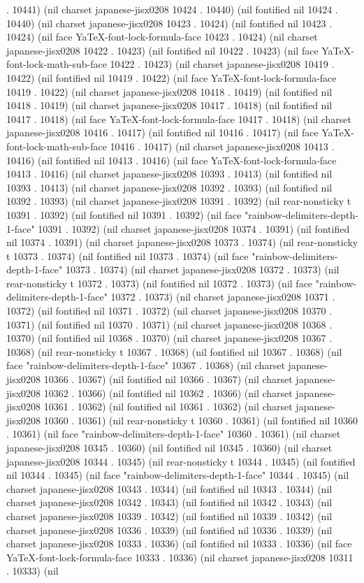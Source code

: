 . 10441) (nil charset japanese-jisx0208 10424 . 10440) (nil fontified nil 10424 . 10440) (nil charset japanese-jisx0208 10423 . 10424) (nil fontified nil 10423 . 10424) (nil face YaTeX-font-lock-formula-face 10423 . 10424) (nil charset japanese-jisx0208 10422 . 10423) (nil fontified nil 10422 . 10423) (nil face YaTeX-font-lock-math-sub-face 10422 . 10423) (nil charset japanese-jisx0208 10419 . 10422) (nil fontified nil 10419 . 10422) (nil face YaTeX-font-lock-formula-face 10419 . 10422) (nil charset japanese-jisx0208 10418 . 10419) (nil fontified nil 10418 . 10419) (nil charset japanese-jisx0208 10417 . 10418) (nil fontified nil 10417 . 10418) (nil face YaTeX-font-lock-formula-face 10417 . 10418) (nil charset japanese-jisx0208 10416 . 10417) (nil fontified nil 10416 . 10417) (nil face YaTeX-font-lock-math-sub-face 10416 . 10417) (nil charset japanese-jisx0208 10413 . 10416) (nil fontified nil 10413 . 10416) (nil face YaTeX-font-lock-formula-face 10413 . 10416) (nil charset japanese-jisx0208 10393 . 10413) (nil fontified nil 10393 . 10413) (nil charset japanese-jisx0208 10392 . 10393) (nil fontified nil 10392 . 10393) (nil charset japanese-jisx0208 10391 . 10392) (nil rear-nonsticky t 10391 . 10392) (nil fontified nil 10391 . 10392) (nil face "rainbow-delimiters-depth-1-face" 10391 . 10392) (nil charset japanese-jisx0208 10374 . 10391) (nil fontified nil 10374 . 10391) (nil charset japanese-jisx0208 10373 . 10374) (nil rear-nonsticky t 10373 . 10374) (nil fontified nil 10373 . 10374) (nil face "rainbow-delimiters-depth-1-face" 10373 . 10374) (nil charset japanese-jisx0208 10372 . 10373) (nil rear-nonsticky t 10372 . 10373) (nil fontified nil 10372 . 10373) (nil face "rainbow-delimiters-depth-1-face" 10372 . 10373) (nil charset japanese-jisx0208 10371 . 10372) (nil fontified nil 10371 . 10372) (nil charset japanese-jisx0208 10370 . 10371) (nil fontified nil 10370 . 10371) (nil charset japanese-jisx0208 10368 . 10370) (nil fontified nil 10368 . 10370) (nil charset japanese-jisx0208 10367 . 10368) (nil rear-nonsticky t 10367 . 10368) (nil fontified nil 10367 . 10368) (nil face "rainbow-delimiters-depth-1-face" 10367 . 10368) (nil charset japanese-jisx0208 10366 . 10367) (nil fontified nil 10366 . 10367) (nil charset japanese-jisx0208 10362 . 10366) (nil fontified nil 10362 . 10366) (nil charset japanese-jisx0208 10361 . 10362) (nil fontified nil 10361 . 10362) (nil charset japanese-jisx0208 10360 . 10361) (nil rear-nonsticky t 10360 . 10361) (nil fontified nil 10360 . 10361) (nil face "rainbow-delimiters-depth-1-face" 10360 . 10361) (nil charset japanese-jisx0208 10345 . 10360) (nil fontified nil 10345 . 10360) (nil charset japanese-jisx0208 10344 . 10345) (nil rear-nonsticky t 10344 . 10345) (nil fontified nil 10344 . 10345) (nil face "rainbow-delimiters-depth-1-face" 10344 . 10345) (nil charset japanese-jisx0208 10343 . 10344) (nil fontified nil 10343 . 10344) (nil charset japanese-jisx0208 10342 . 10343) (nil fontified nil 10342 . 10343) (nil charset japanese-jisx0208 10339 . 10342) (nil fontified nil 10339 . 10342) (nil charset japanese-jisx0208 10336 . 10339) (nil fontified nil 10336 . 10339) (nil charset japanese-jisx0208 10333 . 10336) (nil fontified nil 10333 . 10336) (nil face YaTeX-font-lock-formula-face 10333 . 10336) (nil charset japanese-jisx0208 10311 . 10333) (nil 